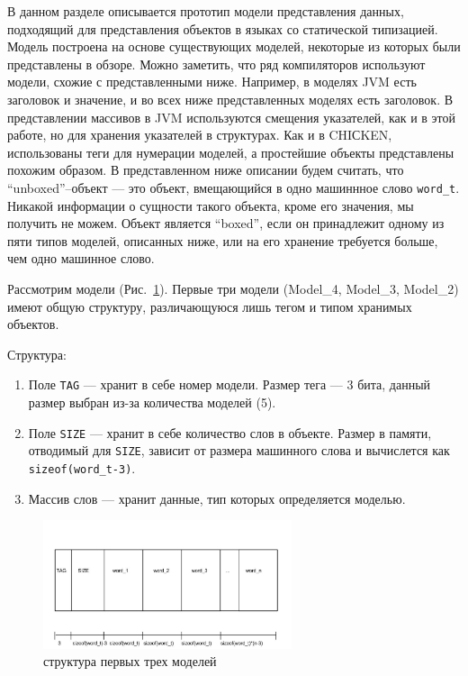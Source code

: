 В данном разделе описывается прототип модели представления данных, подходящий для представления объектов в языках со статической типизацией.
Модель построена на основе существующих моделей, некоторые из которых были представлены в обзоре. Можно заметить, что ряд компиляторов используют модели, схожие с 
представленными ниже. Например, в моделях JVM есть заголовок и значение, и во всех ниже представленных моделях есть заголовок. В представлении массивов в JVM 
используются смещения указателей, как и в этой работе, но для хранения указателей в структурах.  Как и в CHIСKEN, использованы теги для нумерации моделей,
а простейшие объекты представлены похожим образом. В представленном ниже описании будем считать, что ``unboxed''--объект --- это объект,
вмещающийся в одно машиннное слово \lstinline{word_t}.  Никакой информации о сущности такого объекта, кроме его значения, мы получить не можем.
Объект является ``boxed'', если он принадлежит одному из пяти типов моделей, описанных ниже, или на его хранение требуется больше,
чем одно машинное слово.

Рассмотрим модели (Рис.~\ref{first}). Первые три модели (Model\_4, Model\_3, Model\_2) имеют общую структуру, различающуюся лишь тегом и типом хранимых объектов.

Структура:
\begin{enumerate}
\item Поле \lstinline{TAG} --- хранит в себе номер модели. Размер тега --- 3 бита, данный размер выбран из-за количества моделей (5).
\item Поле \lstinline{SIZE} --- хранит в себе количество слов в объекте. Размер в памяти, отводимый для \lstinline{SIZE}, зависит от размера машинного слова и вычислется как \lstinline{sizeof(word_t-3)}.
\item Массив слов --- хранит данные, тип которых определяется моделью.
\end{enumerate}

\begin{figure}[h]
\includegraphics[width=0.65\textwidth]{Kren/1}
\caption{структура первых трех моделей}
\label{first}
\end{figure}

